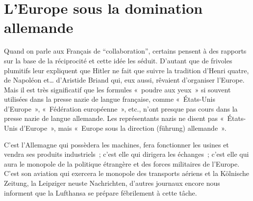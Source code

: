 \documentclass[french,twoside]{book} %
\begin{document}
\section[L’Europe sous la domination allemande]{L’Europe sous la domination allemande}
\noindent Quand on parle aux Français de “collaboration”, certains pensent à des rapports sur la base de la réciprocité et cette idée les séduit. D’autant que de frivoles plumitifs leur expliquent que Hitler ne fait que suivre la tradition d’Henri quatre, de Napoléon et… d’Aristide Briand qui, eux aussi, rêvaient d’organiser l’Europe. Mais il est très significatif que les formules « poudre aux yeux » si souvent utilisées dans la presse nazie de langue française, comme « États-Unis d’Europe », « Fédération européenne », etc., n’ont presque pas cours dans la presse nazie de langue allemande. Les représentants nazis ne disent pas « États-Unis d’Europe », mais « Europe sous la direction (führung) allemande ».\par
C’est l’Allemagne qui possèdera les machines, fera fonctionner les usines et vendra ses produits industriels ; c’est elle qui dirigera les échanges ; c’est elle qui aura le monopole de la politique étrangère et des forces militaires de l’Europe. C’est son aviation qui exercera le monopole des transports aériens et la Kölnische Zeitung, la Leipziger neuste Nachrichten, d’autres journaux encore nous informent que la Lufthansa se prépare fébrilement à cette tâche.
\end{document}
